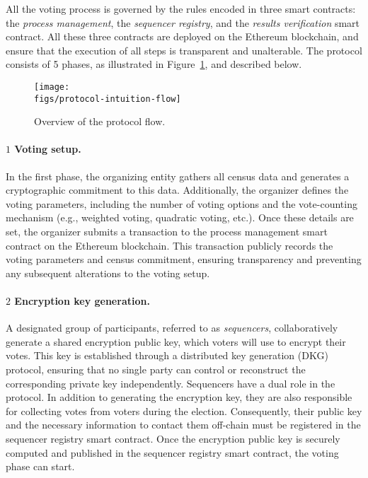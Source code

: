 
All the voting process is governed by the rules encoded in three smart contracts: the \textit{process management}, the \textit{sequencer registry}, and the \textit{results verification} smart contract. All these three contracts are deployed on the Ethereum blockchain, and ensure that the execution of all steps is transparent and unalterable. The protocol consists of 5 phases, as illustrated in Figure~\ref{fig:protocol-intuition}, and described below.\\

\begin{figure}[h]	
	\centerline{\texttt{[image: \\figs/protocol-intuition-flow]}}
	\caption{Overview of the protocol flow.}
	\label{fig:protocol-intuition}
\end{figure}

\paragraph{$\boxed{1}$ Voting setup.}

In the first phase, the organizing entity gathers all census data and generates a cryptographic commitment to this data. %
Additionally, the organizer defines the voting parameters, including the number of voting options and the vote-counting mechanism (e.g., weighted voting, quadratic voting, etc.). Once these details are set, the organizer submits a transaction to the process management smart contract on the Ethereum blockchain. This transaction publicly records the voting parameters and census commitment, ensuring transparency and preventing any subsequent alterations to the voting setup.

\paragraph{$\boxed{2}$ Encryption key generation.}

A designated group of participants, referred to as \textit{sequencers}, collaboratively generate a shared encryption public key, which voters will use to encrypt their votes. This key is established through a distributed key generation (DKG) protocol, ensuring that no single party can control or reconstruct the corresponding private key independently. 
Sequencers have a dual role in the protocol. In addition to generating the encryption key, they are also responsible for collecting votes from voters during the election. Consequently, their public key and the necessary information to contact them off-chain must be registered in the sequencer registry smart contract. Once the encryption public key is securely computed and published in the sequencer registry smart contract, the voting phase can start.

